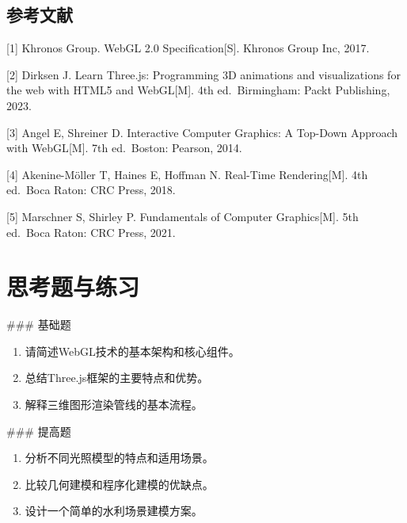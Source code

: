 \begin{tcolorbox}[colback=blue!5!white,colframe=blue!75!black,title=Note 技术发展方向
    
    - **WebGPU标准化**：下一代Web图形API，提供更强的GPU控制能力
    - **实时光线追踪**：硬件支持的实时光线追踪技术在Web端的应用
    - **WebAssembly集成**：结合WASM提升复杂计算的性能表现
    - **云渲染服务**：基于云端GPU的远程渲染解决方案
    - **跨平台统一**：一套代码在多平台（Web、移动、桌面）运行]
\section{参考文献}

\end{tcolorbox}

{[}1{]} Khronos Group. WebGL 2.0 Specification{[}S{]}. Khronos Group Inc, 2017.

{[}2{]} Dirksen J. Learn Three.js: Programming 3D animations and visualizations for the web with HTML5 and WebGL{[}M{]}. 4th ed.~Birmingham: Packt Publishing, 2023.

{[}3{]} Angel E, Shreiner D. Interactive Computer Graphics: A Top-Down Approach with WebGL{[}M{]}. 7th ed.~Boston: Pearson, 2014.

{[}4{]} Akenine-Möller T, Haines E, Hoffman N. Real-Time Rendering{[}M{]}. 4th ed.~Boca Raton: CRC Press, 2018.

{[}5{]} Marschner S, Shirley P. Fundamentals of Computer Graphics{[}M{]}. 5th ed.~Boca Raton: CRC Press, 2021.

\section{思考题与练习}

\#\#\# 基础题

\begin{enumerate}
\def\labelenumi{\arabic{enumi}.}
\tightlist
\item
  请简述WebGL技术的基本架构和核心组件。
\item
  总结Three.js框架的主要特点和优势。
\item
  解释三维图形渲染管线的基本流程。
\end{enumerate}

\#\#\# 提高题

\begin{enumerate}
\def\labelenumi{\arabic{enumi}.}
\setcounter{enumi}{3}
\tightlist
\item
  分析不同光照模型的特点和适用场景。
\item
  比较几何建模和程序化建模的优缺点。
\item
  设计一个简单的水利场景建模方案。
\end{enumerate}

